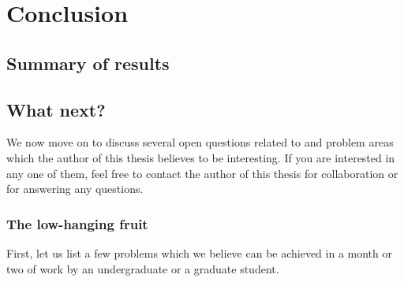 \chapter{Conclusion}\label{chap:conclusion}


\section{Summary of results}


\section{What next?}

We now move on to discuss several open questions related to
\binstretch and problem areas which the author of this thesis believes
to be interesting. If you are interested in any one of them, feel free
to contact the author of this thesis for collaboration or for
answering any questions.

\subsection{The low-hanging fruit}

First, let us list a few problems which we believe can be achieved in
a month or two of work by an undergraduate or a graduate student.

